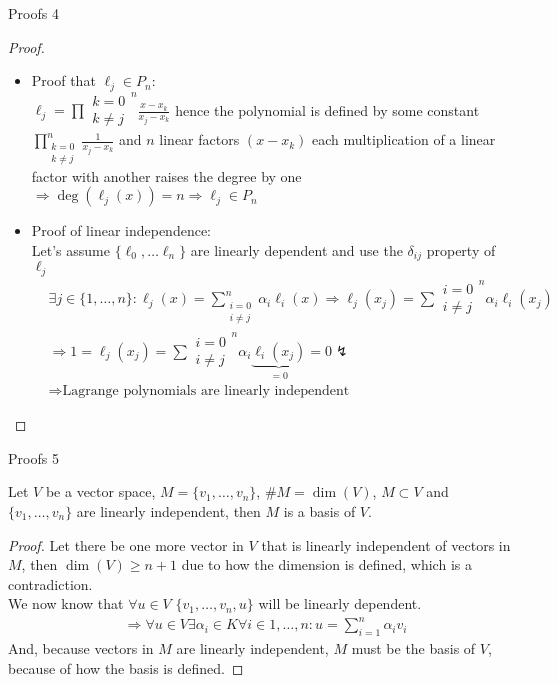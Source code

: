 \documentclass[8pt]{beamer}
\begin{document}
							\begin{frame}{Proofs 4}
								\begin{proof}
									\begin{itemize}
										\item 
										Proof that $\ell_j \in P_n$:\\
										$\displaystyle \ell_j = \prod{\substack{k= 0 \\ k \neq j }}^{n}\frac{x - x_k}{x_j - x_k}$ hence the polynomial is defined by some constant $\displaystyle \prod_{\substack{k= 0 \\ k \neq j }}^{n}\frac{1}{x_j - x_k}$ and $n$ linear factors $(x-x_k)$ each multiplication of a linear factor with another raises the degree by one $\Rightarrow \deg(\ell_j(x)) = n \Rightarrow \ell_j \in P_n$
										\item Proof of linear independence:\\
										Let's assume $\{\ell_0, \ldots \ell_n \}$ are linearly dependent and use the $\delta_{ij}$ property of $\ell_j$
										\begin{align*}
											&\exists j \in \{1, \ldots ,n \} : \ell_j(x) = \sum_{\substack{i= 0 \\ i \neq j }}^{n} \alpha_i \ell_i(x)
											\Rightarrow  \ell_j(x_j) = \sum{\substack{i= 0 \\ i \neq j }}^{n} \alpha_i \ell_i(x_j)\\
											&\Rightarrow 1 = \ell_j(x_j) = \sum{\substack{i= 0 \\ i \neq j }}^{n} \alpha_i \underbrace{\ell_i(x_j)}_{=0} = 0 \lightning\\& \Rightarrow \text{Lagrange polynomials are linearly independent}
										\end{align*}
									\end{itemize}
								\end{proof}
								\end{frame}
									
									\begin{frame}{Proofs 5}
										\begin{theorem}
											Let $V$ be a vector space, $M = \{v_1, \ldots, v_n\}$, $\# M = \dim(V)$, $M \subset V$ and $\{v_1, \ldots, v_n\}$ are linearly independent, then $M$ is a basis of $V$.
										\end{theorem}
										\begin{proof}
											Let there be one more vector in $V$ that is linearly independent of vectors in $M$, then $\dim(V) \geq n+1$ due to how the dimension is defined, which is a contradiction.\\ 
											We now know that $\forall u \in V$ $\{v_1, \ldots, v_n, u\}$ will be linearly dependent.
											\begin{align*}
												&\Rightarrow \forall u \in V \exists \alpha_i \in K \forall i \in 1, \ldots, n: u = \sum_{i = 1}^{n}\alpha_i v_i 
											\end{align*}
											And, because vectors in $M$ are linearly independent, $M$ must be the basis of $V$, because of how the basis is defined.
										\end{proof}
									\end{frame}
											
\end{document}
